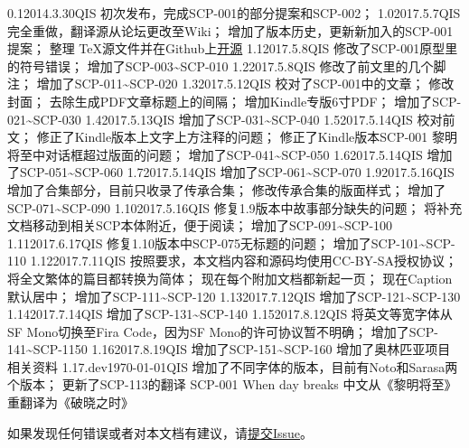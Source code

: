 


\begin{versionhistory}
\vhEntry
{0.1}{2014.3.30}{QIS}{
	初次发布，完成SCP-001的部分提案和SCP-002；
}
\vhEntry
{1.0}{2017.5.7}{QIS}{
	完全重做，翻译源从论坛更改至Wiki；
	增加了版本历史，更新新加入的SCP-001提案；
	整理 \TeX 源文件并在Github上\href{https://github.com/7sDream/scp-pdf}{开源}
}
\vhEntry
{1.1}{2017.5.8}{QIS}{
	修改了SCP-001原型里的符号错误；
	增加了SCP-003\textasciitilde SCP-010
}
\vhEntry
{1.2}{2017.5.8}{QIS}{
	修改了前文里的几个脚注；
	增加了SCP-011\textasciitilde SCP-020
}
\vhEntry
{1.3}{2017.5.12}{QIS}{
	校对了SCP-001中的文章；
	修改封面；
	去除生成PDF文章标题上的间隔；
	增加Kindle专版6寸PDF；
	增加了SCP-021\textasciitilde SCP-030
}
\vhEntry
{1.4}{2017.5.13}{QIS}{
    增加了SCP-031\textasciitilde SCP-040
}
\vhEntry
{1.5}{2017.5.14}{QIS}{
    校对前文；
    修正了Kindle版本上文字上方注释的问题；
    修正了Kindle版本SCP-001 黎明将至中对话框超过版面的问题；
    增加了SCP-041\textasciitilde SCP-050
}
\vhEntry
{1.6}{2017.5.14}{QIS}{
    增加了SCP-051\textasciitilde SCP-060
}
\vhEntry
{1.7}{2017.5.14}{QIS}{
    增加了SCP-061\textasciitilde SCP-070
}
\vhEntry
{1.9}{2017.5.16}{QIS}{
    增加了合集部分，目前只收录了传承合集；
    修改传承合集的版面样式；
    增加了SCP-071\textasciitilde SCP-090
}
\vhEntry
{1.10}{2017.5.16}{QIS}{
    修复1.9版本中故事部分缺失的问题；
    将补充文档移动到相关SCP本体附近，便于阅读；
    增加了SCP-091\textasciitilde SCP-100
}
\vhEntry
{1.11}{2017.6.17}{QIS}{
    修复1.10版本中SCP-075无标题的问题；
    增加了SCP-101\textasciitilde SCP-110
}
\vhEntry
{1.12}{2017.7.11}{QIS}{
    按照要求，本文档内容和源码均使用CC-BY-SA授权协议；
    将全文繁体的篇目都转换为简体；
    现在每个附加文档都新起一页；
    现在Caption默认居中；
    增加了SCP-111\textasciitilde SCP-120
}
\vhEntry
{1.13}{2017.7.12}{QIS}{
    增加了SCP-121\textasciitilde SCP-130
}
\vhEntry
{1.14}{2017.7.14}{QIS}{
    增加了SCP-131\textasciitilde SCP-140
}
\vhEntry
{1.15}{2017.8.12}{QIS}{
    将英文等宽字体从SF Mono切换至Fira Code，因为SF Mono的许可协议暂不明确；
    增加了SCP-141\textasciitilde SCP-1150
}
\vhEntry
{1.16}{2017.8.19}{QIS}{
    增加了SCP-151\textasciitilde SCP-160
    增加了奥林匹亚项目相关资料
}
\vhEntry
{1.17.dev}{\today}{QIS}{
    增加了不同字体的版本，目前有Noto和Sarasa两个版本；
    更新了SCP-113的翻译
    SCP-001 When day breaks 中文从《黎明将至》重翻译为《破晓之时》
}
\end{versionhistory}

如果发现任何错误或者对本文档有建议，请\href{https://github.com/7sDream/scp-pdf/issues}{提交Issue}。
